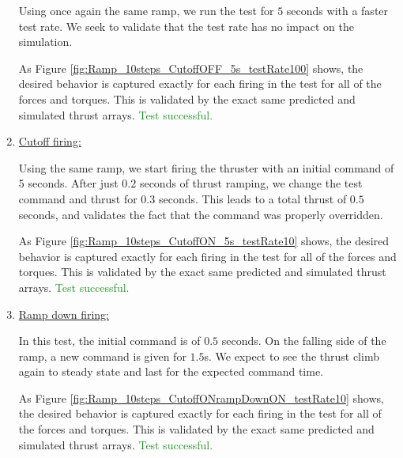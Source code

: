 \begin{enumerate}
	
	
	Using once again the same ramp, we run the test for $5$ seconds with a faster test rate. We seek to validate that the test rate has no impact on the simulation.
	
	
	
	As Figure \ref{fig:Ramp_10steps_CutoffOFF_5s_testRate100} shows, the desired behavior is captured exactly for each 
	firing in the test for all of the forces and torques. This is validated by the exact same predicted and simulated thrust arrays. \textcolor{ForestGreen}{Test successful.}
	
	\item{\underline{Cutoff firing:}}
	
	
	
	Using the same ramp, we start firing the thruster with an initial command of 5 seconds. After just $0.2$ seconds of thrust ramping, we change the test command and thrust for $0.3$ seconds. This leads to a total thrust of $0.5$ seconds, and validates the fact that the command was properly overridden.
	
	
	
	As Figure \ref{fig:Ramp_10steps_CutoffON_5s_testRate10} shows, the desired behavior is captured exactly for each 
	firing in the test for all of the forces and torques. This is validated by the exact same predicted and simulated thrust arrays. \textcolor{ForestGreen}{Test successful.}
	
	\item{\underline{Ramp down firing:}}
	
	
	
	In this test, the initial command is of $0.5$ seconds. On the falling side of the ramp, a new command is given for $1.5$s. We expect to see the thrust climb again to steady state and last for the expected command time.   
	
	
	
	As Figure \ref{fig:Ramp_10steps_CutoffONrampDownON_testRate10} shows, the desired behavior is captured exactly for each 
	firing in the test for all of the forces and torques. This is validated by the exact same predicted and simulated thrust arrays.  \textcolor{ForestGreen}{Test successful.}
	
\end{enumerate}




